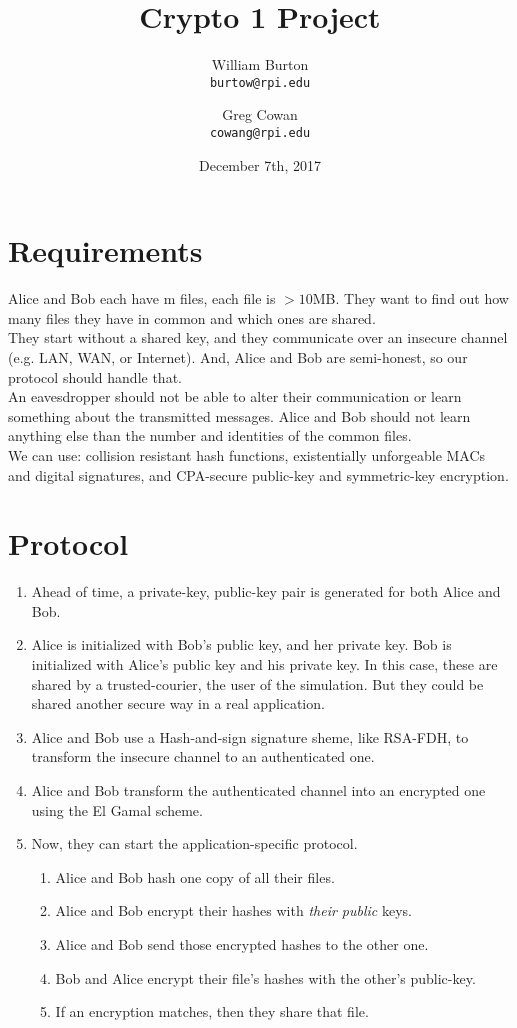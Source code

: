 \documentclass{article}
\title{Crypto 1 Project}
\author{
  William Burton\\
  \texttt{burtow@rpi.edu}
  \and
  Greg Cowan\\
  \texttt{cowang@rpi.edu}
}
\date{December 7th, 2017}
\begin{document}
\maketitle
\begin{flushleft}


\section{Requirements}
Alice and Bob each have m files, each file is $>10$MB. They want to find out
how many files they have in common and which ones are shared. \\
They start without a shared key, and they communicate over an insecure channel
(e.g. LAN, WAN, or Internet). And, Alice and Bob are semi-honest, so our
protocol should handle that. \\
An eavesdropper should not be able to alter their communication or learn
something about the transmitted messages. Alice and Bob should not learn
anything else than the number and identities of the common files. \\
We can use: collision resistant hash functions, existentially unforgeable MACs
and digital signatures, and CPA-secure public-key and symmetric-key encryption.


\section{Protocol}
\begin{enumerate}
  \item Ahead of time, a private-key, public-key pair is generated for both Alice and Bob.
  \item Alice is initialized with Bob's public key, and her private key. Bob is initialized with Alice's public key and his private key.
  In this case, these are shared by a trusted-courier, the user of the simulation. But they could be shared another secure way in a real application.
  \item Alice and Bob use a Hash-and-sign signature sheme, like RSA-FDH, to transform the insecure channel to an authenticated one.
  \item Alice and Bob transform the authenticated channel into an encrypted one using the El Gamal scheme.
  \item Now, they can start the application-specific protocol.
    \begin{enumerate}
      \item Alice and Bob hash one copy of all their files.
      \item Alice and Bob encrypt their hashes with \textit{their public} keys.
      \item Alice and Bob send those encrypted hashes to the other one.
      \item Bob and Alice encrypt their file's hashes with the other's public-key.
      \item If an encryption matches, then they share that file.
    \end{enumerate}
\end{enumerate}


\end{flushleft}
\end{document}
